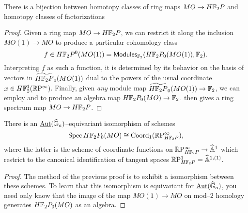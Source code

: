 \begin{corollary}
There is a bijection between homotopy classes of ring maps $MO \to H\mathbb F_2P$ and homotopy classes of factorizations
\begin{center}
\end{center}
\end{corollary}
\begin{proof}
Given a ring map $MO \to H\mathbb F_2P$, we can restrict it along the inclusion $MO(1) \to MO$ to produce a particular cohomology class \[f \in H\mathbb F_2P^0(MO(1)) = \mathsf{Modules}_{\mathbb F_2}(H\mathbb F_2P_0(MO(1)), \mathbb F_2).\]  Interpreting $f$ as such a function, it is determined by its behavior on the basis of vectors in $\widetilde{H\mathbb F_2P}_0(MO(1))$ dual to the powers of the usual coordinate $x \in H\mathbb F_2^1(\mathbb R\mathrm P^\infty)$.  Finally, given \emph{any} module map $\widetilde{H\mathbb F_2P}_0(MO(1)) \to \mathbb F_2$, we can employ  and to produce an algebra map $H\mathbb F_2P_0(MO) \to \mathbb F_2$.  then gives a ring spectrum map $MO \to H\mathbb F_2P$.
\end{proof}

\begin{corollary}
There is an $\operatorname{\underline{\smash{\operatorname{Aut}}}}(\widehat{\mathbb G}_a)$--equivariant isomorphism of schemes \[\operatorname{Spec} H\mathbb F_2P_0(MO) \cong \operatorname{Coord}_1(\mathbb R\mathrm P^\infty_{H\mathbb F_2P}),\] where the latter is the scheme of coordinate functions on $\mathbb R\mathrm P^\infty_{H\mathbb F_2P} \to \widehat{\mathbb{A}}^1$ which restrict to the canonical identification of tangent spaces $\mathbb R\mathrm P^1_{H\mathbb F_2P} = \widehat{\mathbb{A}}^{1,(1)}$.
\end{corollary}
\begin{proof}
The method of the previous proof is to exhibit a isomorphism between these schemes.  To learn that this isomorphism is equivariant for $\operatorname{\underline{\smash{\operatorname{Aut}}}}(\widehat{\mathbb G}_a)$, you need only know that the image of the map $MO(1) \to MO$ on mod--$2$ homology generates $H\mathbb F_2P_0(MO)$ as an algebra.
\end{proof}


